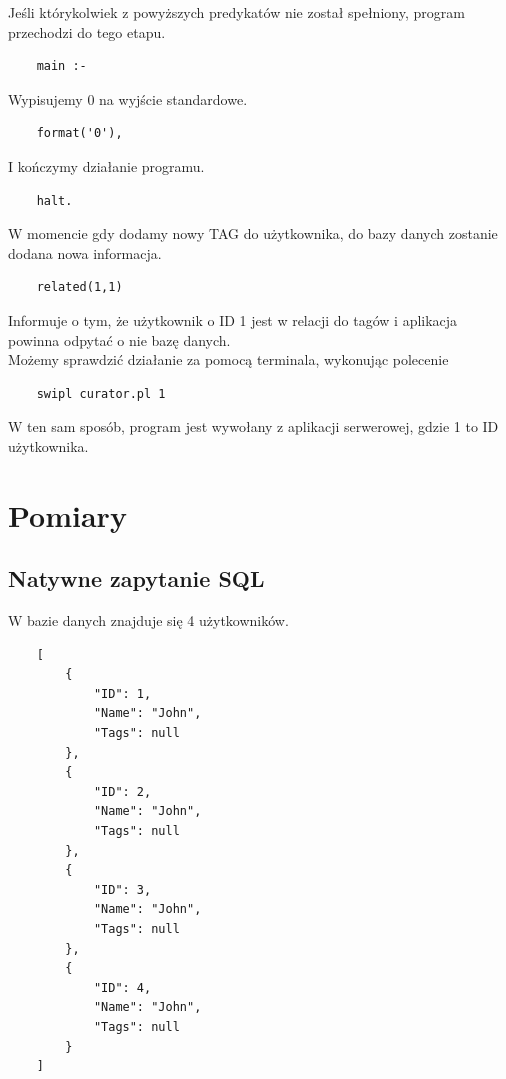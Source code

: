 \documentclass[12pt,a4paper]{article}
\begin{document}
Jeśli którykolwiek z powyższych predykatów nie został spełniony, program przechodzi do tego etapu.
\begin{verbatim}
    main :-
\end{verbatim}

Wypisujemy 0 na wyjście standardowe.
\begin{verbatim}
    format('0'),
\end{verbatim}

I kończymy działanie programu.
\begin{verbatim}
    halt.
\end{verbatim}

W momencie gdy dodamy nowy TAG do użytkownika, do bazy danych zostanie dodana nowa informacja.

\begin{verbatim}
    related(1,1)
\end{verbatim}

Informuje o tym, że użytkownik o ID 1 jest w relacji do tagów i aplikacja powinna odpytać o nie bazę danych.\\

Możemy sprawdzić działanie za pomocą terminala, wykonując polecenie
\begin{verbatim}
    swipl curator.pl 1
\end{verbatim}

W ten sam sposób, program jest wywołany z aplikacji serwerowej, gdzie 1 to ID użytkownika.


\clearpage
\section{Pomiary}

\subsection{Natywne zapytanie SQL}

W bazie danych znajduje się 4 użytkowników.

\begin{verbatim}
    [
        {
            "ID": 1,
            "Name": "John",
            "Tags": null
        },
        {
            "ID": 2,
            "Name": "John",
            "Tags": null
        },
        {
            "ID": 3,
            "Name": "John",
            "Tags": null
        },
        {
            "ID": 4,
            "Name": "John",
            "Tags": null
        }
    ]
\end{verbatim}
\end{document}

